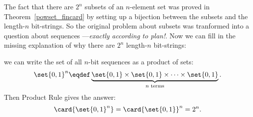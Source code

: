 \iffalse

How many different subsets of an $n$-element set $X$ are there?  For
example, the set $X = \set{x_1, x_2, x_3}$ has eight different subsets:
%
\[
\begin{array}{cccc}
\emptyset & \set{x_1} & \set{x_2} & \set{x_1, x_2} \\
\set{x_3} & \set{x_1, x_3} & \set{x_2, x_3} & \set{x_1, x_2, x_3}.
\end{array}
\]

There is a natural bijection from subsets of $X$ to $n$-bit sequences.
Let $x_1, x_2, \ldots, x_n$ be the elements of $X$.  Then a particular
subset of $X$ maps to the sequence $(b_1, \ldots, b_n)$ where $b_i =
1$ if and only if $x_i$ is in that subset.  For example, if $n = 10$,
then the subset $\set{x_2, x_3, x_5, x_7, x_{10}}$ maps to a 10-bit
sequence as follows:
%
\[
\begin{array}{rrrrrrrrrrrrr}
\text{subset:} &
\{ &    & x_2, & x_3, &    & x_5, &   & x_7, &    &    & x_{10} & \} \\
\text{sequence:} &
(  & 0, &   1, &   1, & 0, &   1, & 0, &   1, & 0, & 0, &        1 & )
\end{array}
\]
\fi

The fact that there are $2^n$ subsets of an $n$-element set was proved
in Theorem~\ref{powset_fincard} by setting up a bijection between the
subsets and the length-$n$ bit-strings.  So the original problem about
subsets was tranformed into a question about sequences
---\emph{exactly according to plan!}.  Now we can fill in the missing
explanation of why there are $2^n$ length-$n$ bit-strings:
\iffalse
Now if we answer the sequence
question, then we've solved our original problem as well.

But how many different $n$-bit sequences are there?  For example,
there are 8 different 3-bit sequences:
%
\[
\begin{array}{ccccccc}
(0,0,0) & \quad & (0,0,1) & \quad & (0,1,0) & \quad & (0,1,1) \\
(1,0,0) & \quad & (1,0,1) & \quad & (1,1,0) & \quad & (1,1,1)
\end{array}
\]

Well,\fi
we can write the set of all $n$-bit sequences as a product of
sets:
%
\[
\set{0,1}^n \eqdef \underbrace{\set{0,1} \times \set{0,1} \times
        \cdots \times \set{0,1}}_{\text{$n$ terms}}.
\]
%
Then Product Rule gives the answer:
%
\[
\card{\set{0,1}^n} = \card{\set{0,1}}^n  = 2^n.
\]


\iffalse
This means that the number of subsets of an $n$-element set $X$ is
also $2^n$.  We'll put this answer to use shortly.
\fi

